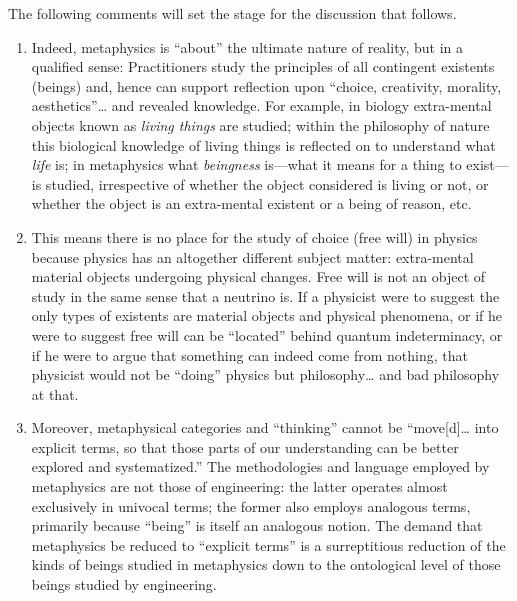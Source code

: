 The following comments will set the stage for the discussion that follows.

\begin{enumerate}
\item Indeed, metaphysics is ``about'' the ultimate nature of reality, but in a qualified sense: Practitioners study the principles of all contingent existents (beings) and, hence can support reflection upon ``choice, creativity, morality, aesthetics''\ldots{} and revealed knowledge. For example, in biology extra-mental objects known as \textit{living things} are studied; within the philosophy of nature this biological knowledge of living things is reflected on to understand what \textit{life} is; in metaphysics what \textit{beingness} is---what it means for a thing to exist---is studied, irrespective of whether the object considered is living or not, or whether the object is an extra-mental existent or a being of reason, etc.
\item This means there is no place for the study of choice (free will) in physics because physics has an altogether different subject matter: extra-mental material objects undergoing physical changes. Free will is not an object of study in the same sense that a neutrino is. If a physicist were to suggest the only types of existents are material objects and physical phenomena, or if he were to suggest free will can be ``located'' behind quantum indeterminacy, or if he were to argue that something can indeed come from nothing, that physicist would not be ``doing'' physics but philosophy\ldots{} and bad philosophy at that.
\item Moreover, metaphysical categories and ``thinking'' cannot be ``move[d]… into explicit terms, so that those parts of our understanding can be better explored and systematized.'' The methodologies and language employed by metaphysics are not those of engineering: the latter operates almost exclusively in univocal terms; the former also employs analogous terms, primarily because ``being'' is itself an analogous notion. The demand that metaphysics be reduced to ``explicit terms'' is a surreptitious reduction of the kinds of beings studied in metaphysics down to the ontological level of those beings studied by engineering.

\end{enumerate}
